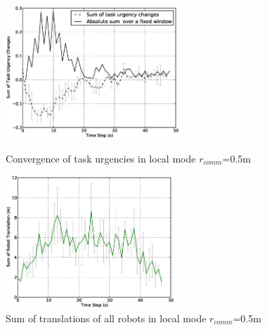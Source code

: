\documentclass[letterpaper, 10 pt, conference]{ieeeconf}  %
\begin{document}
\begin{figure}
\begin{minipage}[t]{0.5\linewidth}
\centering
\includegraphics[height=5cm, angle=0]
{images/local-500cm/Local50cm-TaskUrgencyConvergence.eps}
\caption{\small Convergence of task urgencies in local mode $r_{comm}$=0.5m}
\label{fig:local50cm-convergence} %
\end{minipage}
\hspace{0.5cm}
\begin{minipage}[t]{0.5\linewidth}
\centering
\includegraphics[height=5cm, angle=0]
{images/local-500cm/DeltaTranslationStat.eps}
\caption{\small Sum of translations of all robots in local mode $r_{comm}$=0.5m }
\label{fig:local50cm-tr} %
\end{minipage}
\end{figure}
\end{document}
